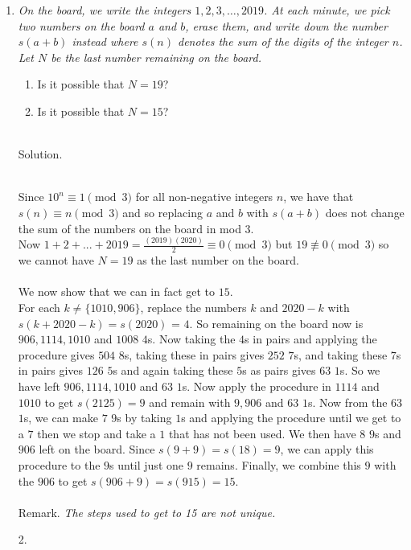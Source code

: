 \documentclass{article}
\begin{document}
\begin{enumerate}

\medskip
\begin{enumerate}

\medskip
\item %
{\itshape On the board, we write the integers $1, 2, 3, \dots, 2019$.
At each minute, we pick two numbers on the board $a$ and $b$, erase them, and write down the number $s(a + b)$ instead where $s(n)$ denotes the sum of the digits of the integer $n$.
Let $N$ be the last number remaining on the board.
\begin{enumerate}
	\item Is it possible that $N = 19$?
	\item Is it possible that $N = 15$?
\end{enumerate}}
\\ Solution.

\\ {Since $10^{n} \equiv 1 \pmod 3$ for all non-negative integers $n$, we have that $s(n) \equiv n \pmod 3$ and so replacing $a$ and $b$ with $s(a+b)$ does not change the sum of the numbers on the board in mod 3. 
\\ Now $1 + 2 +... + 2019 = \frac{(2019)(2020)}{2} \equiv 0 \pmod 3$ but $19 \not\equiv 0 \pmod 3$ so we cannot have $N=19$ as the last number on the board. 
\\
\\ We now show that we can in fact get to $15$. 
\\ For each $k \neq \{1010, 906\}$, replace the numbers $k$ and $2020-k$ with $s(k + 2020-k) = s(2020)$ = $4$. So remaining on the board now is $906, 1114, 1010$ and $1008$ $4$s. Now taking the $4$s in pairs and applying the procedure gives $504$ $8$s, taking these in pairs gives $252$ $7$s, and taking these $7$s in pairs gives $126$ $5$s and again taking these $5$s as pairs gives $63$ $1$s. So we have left $906, 1114, 1010$ and $63$ $1$s. Now apply the procedure in $1114$ and $1010$ to get $s(2125)=9$ and remain with $9, 906$ and $63$ $1$s. Now from the $63$ $1$s, we can make $7$ $9$s by taking $1$s and applying the procedure until we get to a $7$ then we stop and take a $1$ that has not been used. We then have $8$ $9$s and $906$ left on the board. Since $s(9 + 9) = s(18) = 9$, we can apply this procedure to the $9$s until just one $9$ remains. Finally, we combine this $9$ with the $906$ to get $s(906 + 9) = s(915) = 15$.} 
\\ \\Remark. {\itshape The steps used to get to 15 are not unique.}
\medskip
\item[2.]


\end{enumerate}
\end{enumerate}
\end{document}
